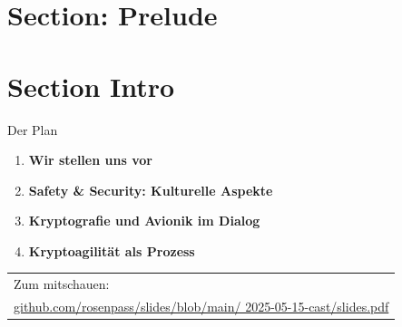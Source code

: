 \section{Section: Prelude}

\section{Section Intro}

\begin{frame}[c]{Der Plan}
  \small

  \begin{enumerate}
    \item \textbf{Wir stellen uns vor}
    \item \textbf{Safety \& Security: Kulturelle Aspekte}
    \item \textbf{Kryptografie und Avionik im Dialog}
    \item \textbf{Kryptoagilität als Prozess}
  \end{enumerate}

	\vfill

    {
      \begin{tabular}[c]{@{\space}l}
      Zum mitschauen:\\
      \footnotesize\href{github.com/rosenpass/slides/blob/main/2025-05-15-cast/slides.pdf}{github.com/rosenpass/slides/blob/main/ 2025-05-15-cast/slides.pdf}
      \end{tabular}
    }
  \vfill
\end{frame}



